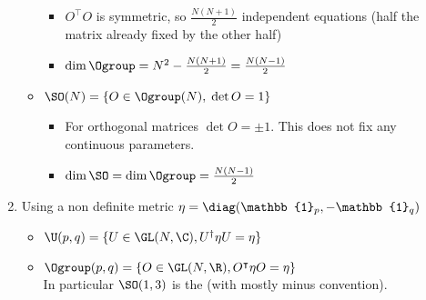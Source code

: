 \begin{enumerate}
\begin{itemize}
\begin{itemize}
\item $O^\intercal O$ is symmetric, so $\frac{N(N+1)}{2}$ independent equations (half the matrix already fixed by the other half)
\item $\dim \Ogroup = N^2 - \frac{N(N+1)}{2} = \frac{N(N-1)}{2}$
\end{itemize}
\item $\SO(N) = \{O\in\Ogroup(N),\; \det O = 1\}$
\begin{itemize}
\item For orthogonal matrices $\det O = \pm 1$. This does not fix any continuous parameters.
\item $\dim \SO = \dim \Ogroup = \frac{N(N-1)}{2}$
\end{itemize}
\end{itemize}
\item Using a non definite metric $\eta = \diag(\mathbb{1}_p, -\mathbb{1}_q)$
\begin{itemize}
\item $\U(p,q) = \{ U\in \GL(N,\C), U^\dagger\eta U = \eta \}$
\item $\Ogroup(p,q) = \{ O\in \GL(N,\R), O^\intercal\eta O = \eta \}$ \\
In particular $\SO(1,3)$ is the  (with mostly minus convention).
\end{itemize}
\end{enumerate}

